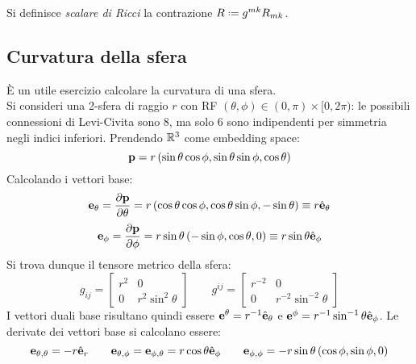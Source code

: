 \begin{definition}
	Si definisce \textit{scalare di Ricci} la contrazione $ R \defeq g^{mk} R_{mk} $.
\end{definition}

\subsection{Curvatura della sfera}

È un utile esercizio calcolare la curvatura di una sfera.\\
Si consideri una 2-sfera di raggio $ r $ con RF $ (\theta,\phi) \in (0,\pi) \times [0,2\pi) $: le possibili connessioni di Levi-Civita sono 8, ma solo 6 sono indipendenti per simmetria negli indici inferiori. Prendendo $ \mathbb{R}^3 $ come embedding space:
\begin{equation*}
	\mathbf{p} = r \left( \sin \theta \cos \phi, \sin \theta \sin \phi, \cos \theta \right)
\end{equation*}
Calcolando i vettori base:
\begin{equation*}
	\mathbf{e}_{\theta} = \frac{\partial \mathbf{p}}{\partial \theta} = r \left( \cos \theta \cos \phi, \cos \theta \sin \phi, -\sin \theta \right) \equiv r \hat{\mathbf{e}}_{\theta}
\end{equation*}
\begin{equation*}
	\mathbf{e}_{\phi} = \frac{\partial \mathbf{p}}{\partial \phi} = r \sin \theta \left( - \sin \phi, \cos \theta, 0 \right) \equiv r \sin \theta \hat{\mathbf{e}}_{\phi}
\end{equation*}
Si trova dunque il tensore metrico della sfera:
\begin{equation*}
	g_{ij} =
	\begin{bmatrix}
		r^2 & 0 \\
		0 & r^2 \sin^2 \theta
	\end{bmatrix}
	\qquad g^{ij} =
	\begin{bmatrix}
		r^{-2} & 0 \\
		0 & r^{-2} \sin^{-2} \theta
	\end{bmatrix}
\end{equation*}
I vettori duali base risultano quindi essere $ \mathbf{e}^{\theta} = r^{-1} \hat{\mathbf{e}}_{\theta} $ e $ \mathbf{e}^{\phi} = r^{-1} \sin^{-1} \theta \hat{\mathbf{e}}_{\phi} $. Le derivate dei vettori base si calcolano essere:
\begin{equation*}
	\mathbf{e}_{\theta,\theta} = -r \hat{\mathbf{e}}_r \qquad \mathbf{e}_{\theta,\phi} = \mathbf{e}_{\phi,\theta} = r \cos \theta \hat{\mathbf{e}}_{\phi} \qquad \mathbf{e}_{\phi,\phi} = - r \sin \theta \left( \cos \phi, \sin \phi, 0 \right)
\end{equation*}
